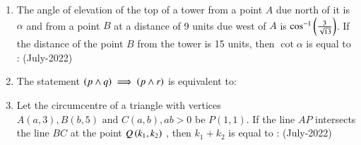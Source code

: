 \documentclass[journal]{IEEEtran}
\begin{document}
\begin{enumerate}
\begin{enumerate}
 \end{enumerate}
 \item The angle of elevation of the top of a tower from a point $A$ due north of it is $\alpha$ and from a point $B$ at a distance of 9 units due west of $A$ is $\cos^{-1}\left(\frac{3}{\sqrt{13}}\right)$. If the distance of the point $B$ from the tower is 15 units, then $\cot{\alpha}$ is equal to : \hfill (July-2022)
 \begin{enumerate}
 \end{enumerate}
 \item The statement $\left(p \wedge q\right) \implies \left(p \wedge r\right)$
 is equivalent to: 
 \begin{enumerate}
 \end{enumerate}
 \item Let the circumcentre of a triangle with vertices $A(a, 3), B(b, 5) \text{ and } C(a, b), ab > 0 $ be $P(1,1)$. If the line $AP$ intersects the line $ BC$ at the point $Q\left(k_1,k_2\right)$
, then $k_1 + k_2$ is equal to : \hfill (July-2022)
\begin{enumerate}

\end{enumerate}
\end{enumerate}
\end{document}
